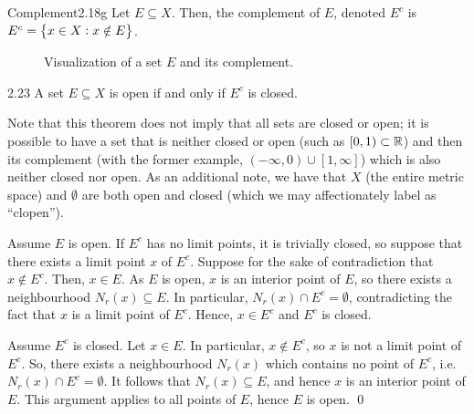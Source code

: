 \setcounter{rudin}{17}
\begin{definition}{Complement}{2.18g}
    Let $E \subseteq X$. Then, the complement of $E$, denoted $E^c$ is $E^c = \set{x \in X: x \notin E}$. 
\end{definition}
\begin{figure}[htbp]
    \centering
    
    \caption{Visualization of a set $E$ and its complement.}
    \label{fig8}
\end{figure}

\setcounter{rudin}{22}
\begin{theorem}{}{2.23}
    A set $E \subseteq X$ is open if and only if $E^c$ is closed.
\end{theorem}
\noindent Note that this theorem does not imply that all sets are closed or open; it is possible to have a set that is neither closed or open (such as $[0, 1) \subset \mathbb{R}$) and then its complement (with the former example, $(-\infty, 0) \cup [1, \infty]$) which is also neither closed nor open. As an additional note, we have that $X$ (the entire metric space) and $\emptyset$ are both open and closed (which we may affectionately label as ``clopen'').

\begin{nproof}
    \boxed{\implies} Assume $E$ is open. If $E^c$ has no limit points, it is trivially closed, so suppose that there exists a limit point $x$ of $E^c$. Suppose for the sake of contradiction that $x \notin E^c$. Then, $x \in E$. As $E$ is open, $x$ is an interior point of $E$, so there exists a neighbourhood $N_r(x) \subseteq E$. In particular, $N_r(x) \cap E^c = \emptyset$, contradicting the fact that $x$ is a limit point of $E^c$. Hence, $x \in E^c$ and $E^c$ is closed.

    \boxed{\impliedby} Assume $E^c$ is closed. Let $x \in E$. In particular, $x \notin E^c$, so $x$ is not a limit point of $E^c$. So, there exists a neighbourhood $N_r(x)$ which contains no point of $E^c$, i.e. $N_r(x) \cap E^c = \emptyset$. It follows that $N_r(x) \subseteq E$, and hence $x$ is an interior point of $E$. This argument applies to all points of $E$, hence $E$ is open. \qed
\end{nproof}

